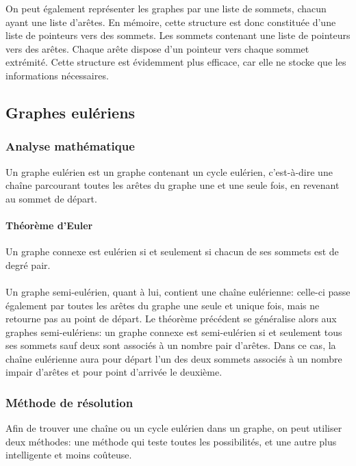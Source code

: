   On peut également représenter les graphes par une liste de sommets,
  chacun ayant une liste d'arêtes.
  En mémoire, cette structure est donc constituée d'une liste de pointeurs
  vers des sommets. Les sommets contenant une liste de pointeurs vers des
  arêtes. Chaque arête dispose d'un pointeur vers chaque sommet extrémité.
  Cette structure est évidemment plus efficace, car elle ne stocke que
  les informations nécessaires.


\subsection{Graphes eulériens}
  \subsubsection{Analyse mathématique}
    Un graphe eulérien est un graphe contenant un cycle eulérien, c'est-à-dire
    une chaîne parcourant toutes les arêtes du graphe une et une seule fois, en
    revenant au sommet de départ.

    \paragraph{Théorème d'Euler} Un graphe connexe est eulérien si et seulement
    si chacun de ses sommets est de degré pair.

    \paragraph{}
    Un graphe semi-eulérien, quant à lui, contient une chaîne eulérienne:
    celle-ci passe également par toutes les arêtes du graphe une seule et
    unique fois, mais ne retourne pas au point de départ. Le théorème précédent
    se généralise alors aux graphes semi-eulériens: un graphe connexe est
    semi-eulérien si et seulement tous ses sommets sauf deux sont associés à un
    nombre pair d'arêtes. Dans ce cas, la chaîne eulérienne aura pour départ
    l'un des deux sommets associés à un nombre impair d'arêtes et pour point
    d'arrivée le deuxième.

  \subsubsection{Méthode de résolution}
    Afin de trouver une chaîne ou un cycle eulérien dans un graphe, on peut
    utiliser deux méthodes: une méthode qui teste toutes les possibilités, et
    une autre plus intelligente et moins coûteuse.

